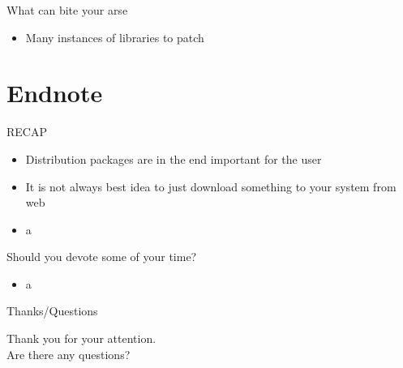 \documentclass{beamer}
\begin{document}
\begin{frame}[t]{What can bite your arse}
	\begin{itemize}
	\item Many instances of libraries to patch
	\end{itemize}
\end{frame}

\section{Endnote}

\begin{frame}[t]{RECAP}
	\begin{itemize}
	\item Distribution packages are in the end important for the user
	\item It is not always best idea to just download something to your system from web
	\item a
	\end{itemize}
\end{frame}

\begin{frame}[t]{Should you devote some of your time?}
	\begin{itemize}
	\item a
	\end{itemize}
\end{frame}

\begin{frame}{Thanks/Questions}
	\begin{center}
	Thank you for your attention.\\
	Are there any questions?
	\end{center}
\end{frame}
\end{document}
